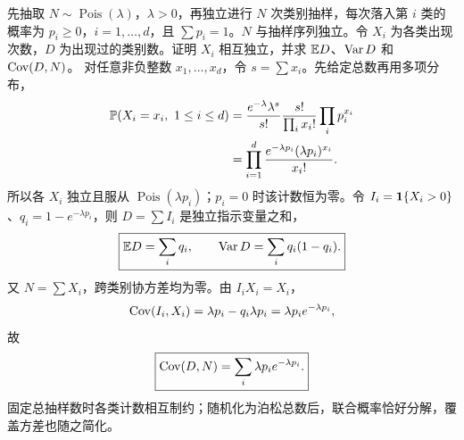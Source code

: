 先抽取 $N\sim\operatorname{Pois}(\lambda)$，$\lambda>0$，再独立进行 $N$ 次类别抽样，每次落入第 $i$ 类的概率为 $p_i\ge0$，$i=1,\ldots,d$，且 $\sum p_i=1$。$N$ 与抽样序列独立。令 $X_i$ 为各类出现次数，$D$ 为出现过的类别数。证明 $X_i$ 相互独立，并求 $\mathbb{E} D$、$\operatorname{Var} D$ 和 $\operatorname{Cov}(D,N)$。
\solution 对任意非负整数 $x_1,\ldots,x_d$，令 $s=\sum x_i$。先给定总数再用多项分布，
\[
\begin{aligned}
\mathbb{P}(X_i=x_i,\ 1\le i\le d)
&=\frac{e^{-\lambda}\lambda^s}{s!}
\frac{s!}{\prod_i x_i!}\prod_i p_i^{x_i}\\
&=\prod_{i=1}^d\frac{e^{-\lambda p_i}(\lambda p_i)^{x_i}}{x_i!}.
\end{aligned}
\]
所以各 $X_i$ 独立且服从 $\operatorname{Pois}(\lambda p_i)$；$p_i=0$ 时该计数恒为零。令 $I_i=\mathbf{1}\{X_i>0\}$、$q_i=1-e^{-\lambda p_i}$，则 $D=\sum I_i$ 是独立指示变量之和，
\[
\boxed{\mathbb{E} D=\sum_i q_i,\qquad \operatorname{Var} D=\sum_i q_i(1-q_i).}
\]
又 $N=\sum X_i$，跨类别协方差均为零。由 $I_iX_i=X_i$，
\[
\operatorname{Cov}(I_i,X_i)=\lambda p_i-q_i\lambda p_i
=\lambda p_i e^{-\lambda p_i},
\]
故
\[
\boxed{\operatorname{Cov}(D,N)=\sum_i\lambda p_i e^{-\lambda p_i}.}
\]
\insight 固定总抽样数时各类计数相互制约；随机化为泊松总数后，联合概率恰好分解，覆盖方差也随之简化。
